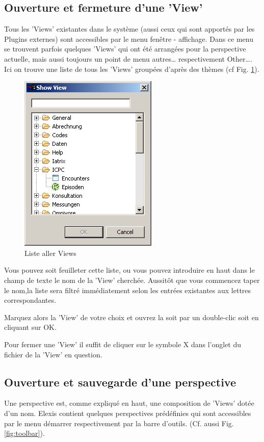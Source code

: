 \subsection{Ouverture et fermeture d'une 'View'}
Tous les 'Views' existantes dans le système (aussi ceux qui sont apportés par les Plugins externes) sont accessibles par le menu fenêtre - affichage. Dans ce menu se trouvent parfois quelques 'Views' qui ont été arrangées pour la perspective actuelle, mais aussi toujours un point de menu  \glqq autres\ldots\grqq{}
respectivement \glqq Other\ldots\grqq{}. Ici on trouve une liste de tous les 'Views' groupées d'après des thèmes (cf Fig. \ref{fig:viewlist}).
\begin{figure}[htp]
\begin{center}
  \includegraphics{images/showviewdialog}
  \caption{Liste aller Views}
  \label{fig:viewlist}
\end{center}
\end{figure}

Vous pouvez soit feuilleter cette liste, ou vous pouvez introduire en haut dans le champ de texte le nom de la 'View' cherchée. Aussitôt que vous commencez taper le nom,la liste sera filtré immédiatement selon les entrées existantes aux lettres correspondantes.

Marquez alors la 'View' de votre choix et ouvrez la soit par un double-clic soit en cliquant sur
\glqq OK\grqq{}.

\par
Pour fermer une 'View' il suffit de cliquer sur le symbole X dans l'onglet du fichier de la 'View' en question.

\subsection{Ouverture et sauvegarde d'une perspective}
\label{perspektiven} 
Une perspective est, comme expliqué en haut, une composition de 'Views' dotée d'un nom.
Elexis contient quelques perspectives prédéfinies qui sont accessibles par le menu démarrer respectivement par la barre d'outils. (Cf. aussi Fig. \ref{fig:toolbar}).

